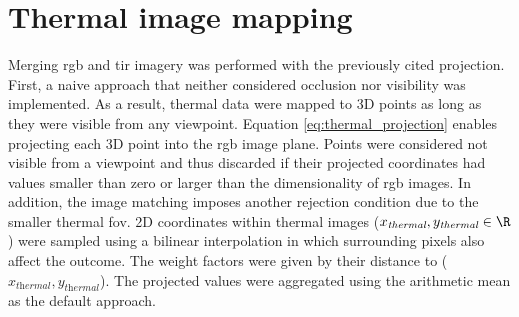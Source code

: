 \section{Thermal image mapping}

Merging \acrshort{rgb} and \acrshort{tir} imagery was performed with the previously cited projection. First, a naive approach that neither considered occlusion nor visibility was implemented. As a result, thermal data were mapped to 3D points as long as they were visible from any viewpoint. Equation \ref{eq:thermal_projection} enables projecting each 3D point into the \acrshort{rgb} image plane. Points were considered not visible from a viewpoint and thus discarded if their projected coordinates had values smaller than zero or larger than the dimensionality of \acrshort{rgb} images. In addition, the image matching imposes another rejection condition due to the smaller thermal \acrshort{fov}. 2D coordinates within thermal images ($x_{\textit{thermal}}, y_{\textit{thermal}} \in \R$) were sampled using a bilinear interpolation in which surrounding pixels also affect the outcome. The weight factors were given by their distance to ($x_{\textit{thermal}}, y_{\textit{thermal}}$). The projected values were aggregated using the arithmetic mean as the default approach.

